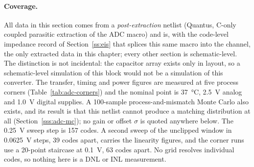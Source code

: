 \paragraph{Coverage.} All data in this section comes from a \emph{post-extraction}
netlist (Quantus, C-only coupled parasitic extraction of the ADC macro)
and is, with the code-level impedance record of Section~\ref{ss:eis} that
splices this same macro into the channel, the only extracted data in this
chapter; every
other section is
schematic-level. The distinction is not incidental: the capacitor array exists
only in layout, so a schematic-level simulation of this block would not be a
simulation of this converter. The transfer, timing and power figures are
measured at five process corners (Table~\ref{tab:adc-corners}) and the nominal
point is \SI{37}{\celsius}, \SI{2.5}{\volt} analog and \SI{1.0}{\volt} digital
supplies. A 100-sample process-and-mismatch Monte Carlo also exists, and its
result is that this netlist cannot produce a matching distribution at all
(Section~\ref{sss:adc-mc}); no gain or offset \(\sigma\) is quoted anywhere
below. The \SI{0.25}{\volt} sweep step is 157 codes. A second sweep of the
unclipped window in \SI{0.0625}{\volt} steps, \num{39} codes apart, carries the
linearity figures, and the corner runs use a 20-point staircase at
\SI{0.1}{\volt}, 63 codes apart. No grid resolves individual codes, so nothing
here is a DNL or INL measurement.
